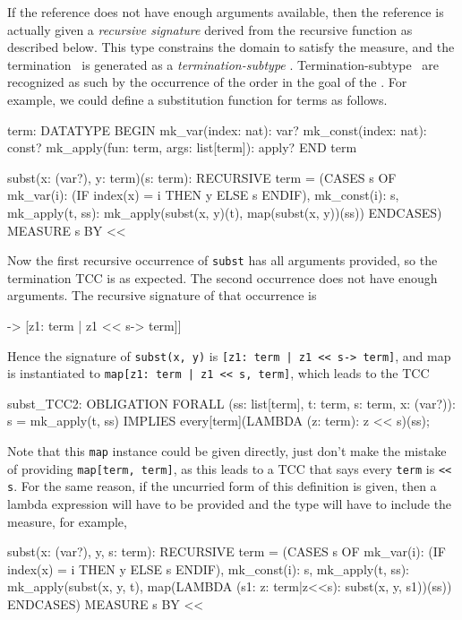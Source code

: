If the reference does not have enough arguments available, then the
reference is actually given a \emph{recursive signature} derived from the recursive function as described below.  This
type constrains the domain to satisfy the measure, and the termination
\tcc\ is generated as a \emph{termination-subtype}
\tcc.
Termination-subtype \tccs\ are recognized as such by the occurrence of the
order in the goal of the \tcc.  For example, we could define a
substitution function for terms as follows.
\begin{session}
  term: DATATYPE
  BEGIN
   mk_var(index: nat): var?
   mk_const(index: nat): const?
   mk_apply(fun: term, args: list[term]): apply?
  END term

  subst(x: (var?), y: term)(s: term): RECURSIVE term =
    (CASES s OF
      mk_var(i): (IF index(x) = i THEN y ELSE s ENDIF),
      mk_const(i): s,
      mk_apply(t, ss): mk_apply(subst(x, y)(t), map(subst(x, y))(ss))
     ENDCASES)
  MEASURE s BY <<
\end{session}
Now the first recursive occurrence of \texttt{subst} has all arguments
provided, so the termination TCC is as expected.  The second occurrence
does not have enough arguments.  The recursive signature of that
occurrence is
\begin{pvsex}
  [[(var?), term] -> [\setb{}z1: term | z1 << s\sete -> term]]
\end{pvsex}
Hence the signature of \texttt{subst(x, y)} is \texttt{[\setb{}z1:\ term | z1 <<
s\sete -> term]}, and map is instantiated to \texttt{map[\setb{}z1:\ term | z1 <<
s\sete, term]}, which leads to the TCC
\begin{pvsex}
 subst_TCC2: OBLIGATION
   FORALL (ss: list[term], t: term, s: term, x: (var?)):
     s = mk_apply(t, ss) IMPLIES every[term](LAMBDA (z: term): z << s)(ss);
\end{pvsex}
Note that this \texttt{map} instance could be given directly, just don't
make the mistake of providing \texttt{map[term, term]}, as this leads to a
TCC that says every \texttt{term} is \texttt{<<} \texttt{s}.
For the same reason, if the uncurried form of this definition is given,
then a lambda expression will have to be provided and the type will have
to include the measure, for example,
\begin{session}
   subst(x: (var?), y, s: term): RECURSIVE term =
     (CASES s OF
       mk_var(i): (IF index(x) = i THEN y ELSE s ENDIF),
       mk_const(i): s,
       mk_apply(t, ss): mk_apply(subst(x, y, t),
                                 map(LAMBDA (s1: \setb{}z: term|z<<s\sete):
                                       subst(x, y, s1))(ss))
      ENDCASES)
   MEASURE s BY <<
\end{session}
\renewcommand{\textfraction}{.1}


